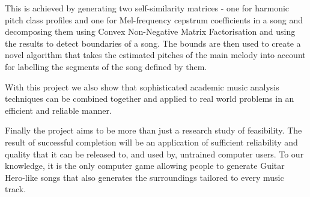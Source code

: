 This is achieved by generating two self-similarity matrices - one for harmonic pitch class profiles and one for Mel-frequency cepstrum coefficients in a song and decomposing them using Convex Non-Negative Matrix Factorisation and using the results to detect boundaries of a song. The bounds are then used to create a novel algorithm that takes the estimated pitches of the main melody into account for labelling the segments of the song defined by them.

With this project we also show that sophisticated academic music analysis techniques can be combined together and applied to real world problems in an efficient and reliable manner. 

Finally the project aims to be more than just a research study of feasibility. The result of successful completion will be an application of sufficient reliability and quality that it can be released to, and used by, untrained computer users. To our knowledge, it is the only computer game allowing people to generate Guitar Hero-like songs that also generates the surroundings tailored to every music track.

